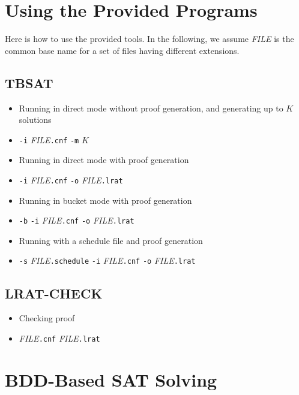 \newpage

\section*{Using the Provided Programs}

Here is how to use the provided tools.  In the following, we assume
{\it FILE} is the common base name for a set of files having different extensions.


\subsection*{TBSAT}

\begin{itemize}
\item Running in direct mode without proof generation, and generating up to $K$ solutions
\item[] \texttt{-i} {\it FILE}\texttt{.cnf} \texttt{-m} $K$
\item Running in direct mode with proof generation
\item[] \texttt{-i} {\it FILE}\texttt{.cnf} \texttt{-o} {\it FILE}\texttt{.lrat}
\item Running in bucket mode with proof generation
\item[] \texttt{-b} \texttt{-i} {\it FILE}\texttt{.cnf} \texttt{-o} {\it FILE}\texttt{.lrat}
\item Running with a schedule file and proof generation
\item[] \texttt{-s} {\it FILE}\texttt{.schedule} \texttt{-i} {\it FILE}\texttt{.cnf} \texttt{-o} {\it FILE}\texttt{.lrat}
\end{itemize}

\subsection*{LRAT-CHECK}

\begin{itemize}
\item Checking proof
\item[] {\it FILE}\texttt{.cnf} {\it FILE}\texttt{.lrat}
\end{itemize}


\newpage

\section*{BDD-Based SAT Solving}

